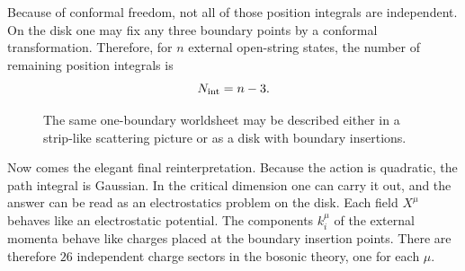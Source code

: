 Because of conformal freedom, not all of those position integrals are independent. On the disk one may fix any three boundary points by a conformal transformation. Therefore, for \(n\) external open-string states, the number of remaining position integrals is
\begin{equation}
N_{\rm int}=n-3.
\end{equation}

\begin{figure}[h]
\centering
{}
\hspace{0.9cm}
\caption{The same one-boundary worldsheet may be described either in a strip-like scattering picture or as a disk with boundary insertions.}
\end{figure}

Now comes the elegant final reinterpretation. Because the action is quadratic, the path integral is Gaussian. In the critical dimension one can carry it out, and the answer can be read as an electrostatics problem on the disk. Each field \(X^\mu\) behaves like an electrostatic potential. The components \(k_i^\mu\) of the external momenta behave like charges placed at the boundary insertion points. There are therefore \(26\) independent charge sectors in the bosonic theory, one for each \(\mu\).

